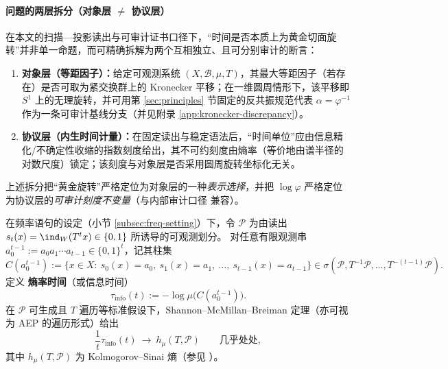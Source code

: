 \paragraph{问题的两层拆分（对象层 \texorpdfstring{$\neq$}{≠} 协议层）}
在本文的扫描—投影读出与可审计证书口径下，“时间是否本质上为黄金切面旋转”并非单一命题，而可精确拆解为两个互相独立、且可分别审计的断言：
\begin{enumerate}
  \item \textbf{对象层（等距因子）：}给定可观测系统 \((X,\mathcal{B},\mu,T)\)，其最大等距因子（若存在）是否可取为紧交换群上的 Kronecker 平移；在一维圆周情形下，该平移即 \(S^1\) 上的无理旋转，并可用第 \ref{sec:principles} 节固定的反共振规范代表 \(\alpha=\varphi^{-1}\) 作为一条可审计基线分支（并见附录 \ref{app:kronecker-discrepancy}）。
  \item \textbf{协议层（内生时间计量）：}在固定读出与稳定语法后，“时间单位”应由信息精化/不确定性收缩的指数刻度给出，其不可约刻度由熵率（等价地由谱半径的对数尺度）锁定；该刻度与对象层是否采用圆周旋转坐标化无关。
\end{enumerate}
上述拆分把“黄金旋转”严格定位为对象层的一种\emph{表示选择}，并把 \(\log\varphi\) 严格定位为协议层的\emph{可审计刻度不变量}（与内部审计口径 \cite{Internal2025ResolutionFoldingPhiPiE} 兼容）。
\par

\begin{definition}\label{def:entropy-rate-time}
在频率语句的设定（小节 \ref{subsec:freq-setting}）下，令 \(\mathcal{P}\) 为由读出 \(s_t(x)=\ind_W(T^t x)\in\{0,1\}\) 所诱导的可观测划分。
对任意有限观测串 \(a_0^{t-1}:=a_0a_1\cdots a_{t-1}\in\{0,1\}^t\)，记其柱集
\[
C(a_0^{t-1})
:=\bigl\{x\in X:\ s_0(x)=a_0,\ s_1(x)=a_1,\ \dots,\ s_{t-1}(x)=a_{t-1}\bigr\}\in\sigma(\mathcal{P},T^{-1}\mathcal{P},\dots,T^{-(t-1)}\mathcal{P}).
\]
定义 \textbf{熵率时间}（或信息时间）
\[
\tau_{\mathrm{info}}(t)
:=-\log \mu\bigl(C(a_0^{t-1})\bigr).
\]
在 \(\mathcal{P}\) 可生成且 \(T\) 遍历等标准假设下，Shannon--McMillan--Breiman 定理（亦可视为 AEP 的遍历形式）给出
\[
\frac{1}{t}\tau_{\mathrm{info}}(t)\ \longrightarrow\ h_\mu(T,\mathcal{P})
\qquad\text{几乎处处},
\]
其中 \(h_\mu(T,\mathcal{P})\) 为 Kolmogorov--Sinai 熵（参见 \cite{WaltersErgodicTheory,CoverThomas2006}）。
\end{definition}

